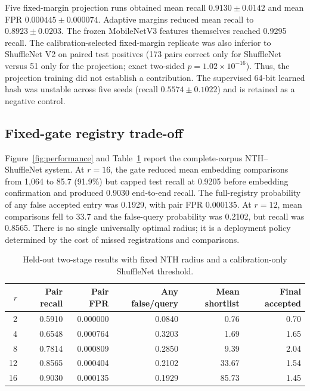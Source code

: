 \documentclass[12pt]{article}
\begin{document}
Five fixed-margin projection runs obtained mean recall $0.9130\pm0.0142$ and mean FPR $0.000445\pm0.000074$. Adaptive margins reduced mean recall to $0.8923\pm0.0203$. The frozen MobileNetV3 features themselves reached 0.9295 recall. The calibration-selected fixed-margin replicate was also inferior to ShuffleNet V2 on paired test positives (173 pairs correct only for ShuffleNet versus 51 only for the projection; exact two-sided $p=1.02\times10^{-16}$). Thus, the projection training did not establish a contribution. The supervised 64-bit learned hash was unstable across five seeds (recall $0.5574\pm0.1022$) and is retained as a negative control.

\subsection{Fixed-gate registry trade-off}

Figure~\ref{fig:performance} and Table~\ref{tab:twostage} report the complete-corpus NTH--ShuffleNet system. At $r=16$, the gate reduced mean embedding comparisons from 1,064 to 85.7 (91.9\%) but capped test recall at 0.9205 before embedding confirmation and produced 0.9030 end-to-end recall. The full-registry probability of any false accepted entry was 0.1929, with pair FPR 0.000135. At $r=12$, mean comparisons fell to 33.7 and the false-query probability was 0.2102, but recall was 0.8565. There is no single universally optimal radius; it is a deployment policy determined by the cost of missed registrations and comparisons.

\begin{table}[ht]
\centering
\caption{Held-out two-stage results with fixed NTH radius and a calibration-only ShuffleNet threshold.}
\label{tab:twostage}
\begin{tabular}{rrrrrr}
\toprule
$r$ & Pair recall & Pair FPR & Any false/query & Mean shortlist & Final accepted\\
\midrule
2  & 0.5910 & 0.000000 & 0.0840 & 0.76 & 0.70\\
4  & 0.6548 & 0.000764 & 0.3203 & 1.69 & 1.65\\
8  & 0.7814 & 0.000809 & 0.2850 & 9.39 & 2.04\\
12 & 0.8565 & 0.000404 & 0.2102 & 33.67 & 1.54\\
16 & 0.9030 & 0.000135 & 0.1929 & 85.73 & 1.45\\
\bottomrule
\end{tabular}
\end{table}
\end{document}
